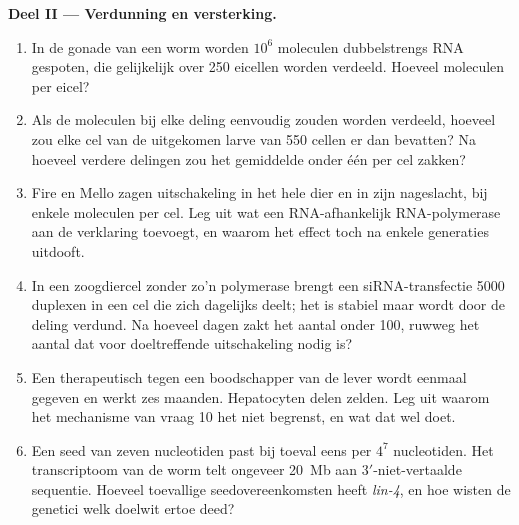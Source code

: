 \begin{problem}
\medskip
\noindent\textbf{Deel II --- Verdunning en versterking.}
\begin{enumerate}[resume]
  \item In de gonade van een worm worden $10^{6}$ moleculen
        dubbelstrengs RNA gespoten, die gelijkelijk over \num{250}
        eicellen worden verdeeld. Hoeveel moleculen per eicel?
  \item Als de moleculen bij elke deling eenvoudig zouden worden
        verdeeld, hoeveel zou elke cel van de uitgekomen larve van
        \num{550} cellen er dan bevatten? Na hoeveel verdere delingen
        zou het gemiddelde onder één per cel zakken?
  \item Fire en Mello zagen uitschakeling in het hele dier en in zijn
        nageslacht, bij enkele moleculen per cel. Leg uit wat een
        RNA-afhankelijk RNA-polymerase aan de verklaring toevoegt, en
        waarom het effect toch na enkele generaties uitdooft.
  \item In een zoogdiercel zonder zo'n polymerase brengt een
        siRNA-transfectie \num{5000} duplexen in een cel die zich
        dagelijks deelt; het  is stabiel maar wordt door de
        deling verdund. Na hoeveel dagen zakt het aantal onder
        \num{100}, ruwweg het aantal dat voor doeltreffende
        uitschakeling nodig is?
  \item Een therapeutisch  tegen een boodschapper van de lever
        wordt eenmaal gegeven en werkt zes maanden. Hepatocyten delen
        zelden. Leg uit waarom het mechanisme van vraag 10 het niet
        begrenst, en wat dat wel doet.
  \item Een seed van zeven nucleotiden past bij toeval eens per
        $4^{7}$ nucleotiden. Het transcriptoom van de worm telt
        ongeveer \qty{20}{Mb} aan 3$'$-niet-vertaalde sequentie.
        Hoeveel toevallige seedovereenkomsten heeft \emph{lin-4}, en
        hoe wisten de genetici welk doelwit ertoe deed?
\end{enumerate}


\end{problem}
